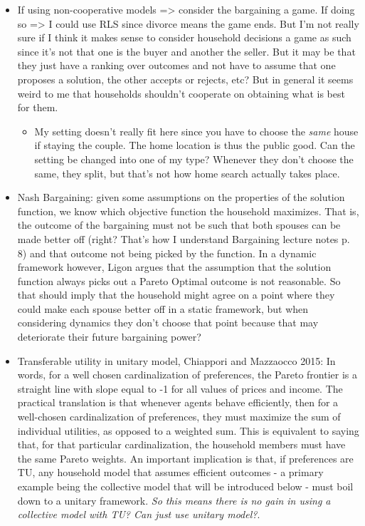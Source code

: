 \begin{itemize}
\item If using non-cooperative models => consider the bargaining a game. If doing so => I could use RLS since divorce means the game ends. But I'm not really sure if I think it makes sense to consider household decisions a game as such since it's not that one is the buyer and another the seller. But it may be that they just have a ranking over outcomes and not have to assume that one proposes a solution, the other accepts or rejects, etc? But in general it seems weird to me that households shouldn't cooperate on obtaining what is best for them.
\begin{itemize}
\item My setting doesn't really fit here since you have to choose the \textit{same} house if staying the couple. The home location is thus the public good. Can the setting be changed into one of my type? Whenever they don't choose the same, they split, but that's not how home search actually takes place.
\end{itemize}
\item Nash Bargaining: given some assumptions on the properties of the solution function, we know which objective function the household maximizes. That is, the outcome of the bargaining must not be such that both spouses can be made better off (right? That's how I understand Bargaining lecture notes p. 8) and that outcome not being picked by the function. In a dynamic framework however, Ligon argues that the assumption that the solution function always picks out a Pareto Optimal outcome is not reasonable. So that should imply that the household might agree on a point where they could make each spouse better off in a static framework, but when considering dynamics they don't choose that point because that may deteriorate their future bargaining power? 
\item Transferable utility in unitary model, Chiappori and Mazzaocco 2015: In words, for a well chosen cardinalization of preferences, the Pareto frontier is a straight line with slope equal to -1 for all values of prices and income. The practical translation is that whenever agents behave efficiently, then for a well-chosen cardinalization of preferences, they must maximize the sum of individual utilities, as opposed to a weighted sum. This is equivalent to saying that, for that particular cardinalization, the household members must have the same Pareto weights. An important  implication is that, if preferences are TU, any household model that assumes efficient outcomes - a primary example being the collective model that will be introduced below - must boil down to a unitary framework. \textit{So this means there is no gain in using a collective model with TU? Can just use unitary model?}.

\end{itemize}
